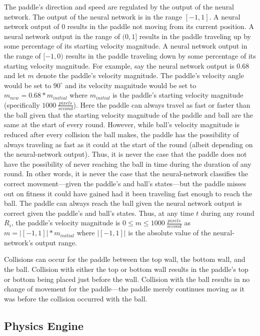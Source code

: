 \documentclass[a4paper,10pt]{article}
\begin{document}
The paddle's direction and speed are regulated by the output of the neural network. The output of the neural network is in the range $[-1,1]$. A neural network output of $0$ results in the paddle not moving from its current position. A neural network output in the range of $(0,1]$ results in the paddle traveling up by some percentage of its starting velocity magnitude. A neural network output in the range of $[-1,0)$ results in the paddle traveling down by some percentage of its starting velocity magnitude. For example, say the neural network output is $0.68$ and let $m$ denote the paddle's velocity magnitude. The paddle's velocity angle would be set to $90^\circ$ and its velocity magnitude would be set to $m_{new}=0.68*m_{initial}$ where $m_{initial}$ is the paddle's starting velocity magnitude (specifically $1000 \ \frac{pixels}{second}$). Here the paddle can always travel as fast or faster than the ball given that the starting velocity magnitude of the paddle and ball are the same at the start of every round. However, while ball's velocity magnitude is reduced after every collision the ball makes, the paddle has the possibility of always traveling as fast as it could at the start of the round (albeit depending on the neural-network output). Thus, it is never the case that the paddle does not have the possibility of never reaching the ball in time during the duration of any round. In other words, it is never the case that the neural-network classifies the correct movement---given the paddle's and ball's states---but the paddle misses out on fitness it could have gained had it been traveling fast enough to reach the ball. The paddle can always reach the ball given the neural network output is correct given the paddle's and ball's states. Thus, at any time $t$ during any round $R_i$, the paddle's velocity magnitude is $0\leq m \leq 1000 \ \frac{pixels}{second}$ as $m = \left|[-1,1]\right| * m_{initial}$ where $\left|[-1,1]\right|$ is the absolute value of the neural-network's output range.    

Collisions can occur for the paddle between the top wall, the bottom wall, and the ball. Collision with either the top or bottom wall results in the paddle's top or bottom being placed just before the wall. Collision with the ball results in no change of movement for the paddle---the paddle merely continues moving as it was before the collision occurred with the ball.

\subsection{Physics Engine}
\end{document}
